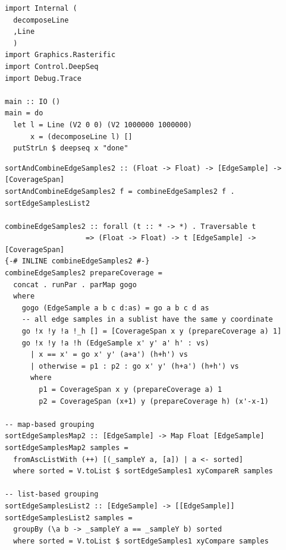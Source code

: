 \documentclass[12pt, a4paper]{article}
\begin{document}
\begin{lstlisting}[caption={Decomposing a very long single line.}, label={lst:singleline}]
import Internal (
  decomposeLine
  ,Line
  )
import Graphics.Rasterific
import Control.DeepSeq
import Debug.Trace

main :: IO ()
main = do
  let l = Line (V2 0 0) (V2 1000000 1000000)
      x = (decomposeLine l) []
  putStrLn $ deepseq x "done"
\end{lstlisting}

\begin{lstlisting}[label={lst:combinegroup}, caption={combineEdgeSamples with grouping}]
sortAndCombineEdgeSamples2 :: (Float -> Float) -> [EdgeSample] -> [CoverageSpan]
sortAndCombineEdgeSamples2 f = combineEdgeSamples2 f . sortEdgeSamplesList2

combineEdgeSamples2 :: forall (t :: * -> *) . Traversable t
                   => (Float -> Float) -> t [EdgeSample] -> [CoverageSpan]
{-# INLINE combineEdgeSamples2 #-}
combineEdgeSamples2 prepareCoverage =
  concat . runPar . parMap gogo
  where
    gogo (EdgeSample a b c d:as) = go a b c d as
    -- all edge samples in a sublist have the same y coordinate
    go !x !y !a !_h [] = [CoverageSpan x y (prepareCoverage a) 1]
    go !x !y !a !h (EdgeSample x' y' a' h' : vs)
      | x == x' = go x' y' (a+a') (h+h') vs
      | otherwise = p1 : p2 : go x' y' (h+a') (h+h') vs
      where
        p1 = CoverageSpan x y (prepareCoverage a) 1
        p2 = CoverageSpan (x+1) y (prepareCoverage h) (x'-x-1)

-- map-based grouping
sortEdgeSamplesMap2 :: [EdgeSample] -> Map Float [EdgeSample]
sortEdgeSamplesMap2 samples =
  fromAscListWith (++) [(_sampleY a, [a]) | a <- sorted]
  where sorted = V.toList $ sortEdgeSamples1 xyCompareR samples

-- list-based grouping
sortEdgeSamplesList2 :: [EdgeSample] -> [[EdgeSample]]
sortEdgeSamplesList2 samples =
  groupBy (\a b -> _sampleY a == _sampleY b) sorted
  where sorted = V.toList $ sortEdgeSamples1 xyCompare samples
\end{lstlisting}
\end{document}
